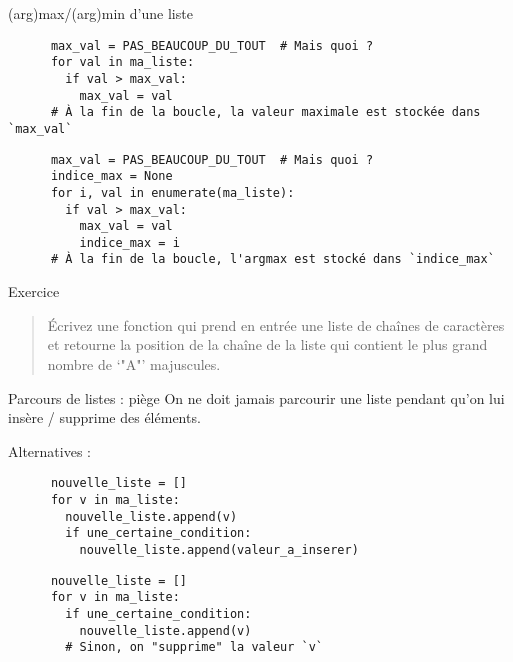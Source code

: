 \documentclass[10pt]{beamer}
\begin{document}
\begin{frame}[fragile]{(arg)max/(arg)min d'une liste}
  \begin{beamercodeblock}
    \begin{verbatim}
      max_val = PAS_BEAUCOUP_DU_TOUT  # Mais quoi ?
      for val in ma_liste:
        if val > max_val:
          max_val = val
      # À la fin de la boucle, la valeur maximale est stockée dans `max_val`
    \end{verbatim}
  \end{beamercodeblock}

  \pause
  
  \begin{beamercodeblock}
    \begin{verbatim}
      max_val = PAS_BEAUCOUP_DU_TOUT  # Mais quoi ?
      indice_max = None
      for i, val in enumerate(ma_liste):
        if val > max_val:
          max_val = val
          indice_max = i
      # À la fin de la boucle, l'argmax est stocké dans `indice_max`
    \end{verbatim}
  \end{beamercodeblock}
\end{frame}

\begin{frame}[fragile]{Exercice}
  \begin{quote}
    Écrivez une fonction qui prend en entrée une liste de chaînes de caractères et retourne la position de la chaîne de la liste qui contient le plus grand nombre de `"A"' majuscules.
  \end{quote}
\end{frame}

\begin{frame}[fragile]{Parcours de listes : piège}  
  On ne doit \alert{jamais} parcourir une liste pendant qu'on lui insère / supprime des éléments.

  Alternatives :

  \begin{beamercodeblock}
    \begin{verbatim}
      nouvelle_liste = []
      for v in ma_liste:
        nouvelle_liste.append(v)
        if une_certaine_condition:
          nouvelle_liste.append(valeur_a_inserer)
    \end{verbatim}
  \end{beamercodeblock}
  
  \begin{beamercodeblock}
    \begin{verbatim}
      nouvelle_liste = []
      for v in ma_liste:
        if une_certaine_condition:
          nouvelle_liste.append(v)
        # Sinon, on "supprime" la valeur `v`
    \end{verbatim}
  \end{beamercodeblock}
\end{frame}
\end{document}
